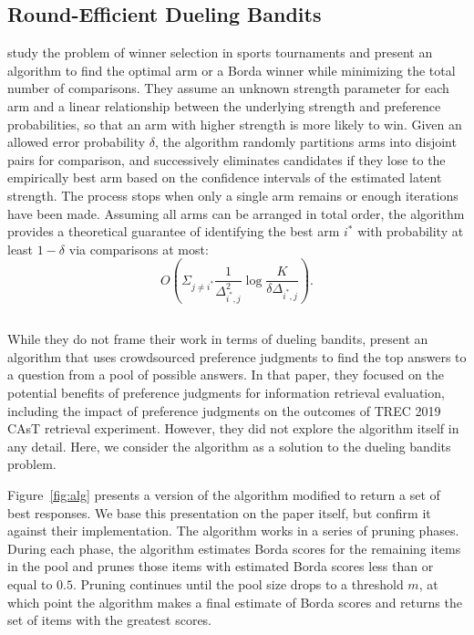 \subsection{Round-Efficient Dueling Bandits}

\citet{ll18} study the problem of winner selection in sports tournaments and present an algorithm to find the optimal arm or a Borda winner while minimizing the total number of comparisons. They assume an unknown strength parameter for each arm and a linear relationship between the underlying strength and preference probabilities, so that an arm with higher strength is more likely to win. Given an allowed error probability $\delta$, the algorithm randomly partitions arms into disjoint pairs for comparison, and successively eliminates candidates if they lose to the empirically best arm based on the confidence intervals of the estimated latent strength. The process stops when only a single arm remains or enough iterations have been made. Assuming all arms can be arranged in total order, the algorithm provides a theoretical guarantee of identifying the best arm $i^*$ with probability at least $1 - \delta$ via comparisons at most:
\[
O\left(\Sigma_{j \ne i^*} \frac{1}{\Delta_{i^*, j}^2} \log \frac{K}{\delta \Delta_{i^*, j}}\right).
\]

\subsection{\citet{cvs21}}
\label{sec:alg:clarke}

While they do not frame their work in terms of dueling bandits, \citet{cvs21} present an algorithm that uses crowdsourced preference judgments to find the top answers to a question from a pool of possible answers.  In that paper, they focused on the potential benefits of preference judgments for information retrieval evaluation, including the impact of preference judgments on the outcomes of TREC 2019 CAsT retrieval experiment. However, they did not explore the algorithm itself in any detail. Here, we consider the algorithm as a solution to the dueling bandits problem.

Figure~\ref{fig:alg} presents a version of the algorithm modified to return a set of best responses. We base this presentation on the paper itself, but confirm it against their implementation. The algorithm works in a series of pruning phases. During each phase, the algorithm estimates Borda scores for the remaining items in the pool and prunes those items with estimated Borda scores less than or equal to $0.5$. Pruning continues until the pool size drops to a threshold $m$, at which point the algorithm makes a final estimate of Borda scores and returns the set of items with the greatest scores.

